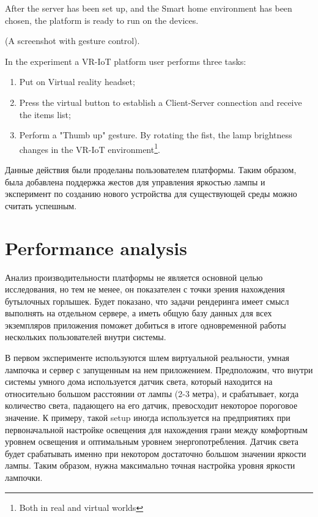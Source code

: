 After the server has been set up, and the Smart home environment has been chosen, the platform is ready to run on the devices.

(A screenshot with gesture control).

In the experiment a VR-IoT platform user performs three tasks:
\begin{enumerate}
    \item Put on Virtual reality headset;
    \item Press the virtual button to establish a Client-Server connection and receive the items list;
    \item Perform a "Thumb up" gesture. By rotating the fist, the lamp brightness changes in the VR-IoT environment\footnote{Both in real and virtual worlds}.
\end{enumerate}

Данные действия были проделаны пользователем платформы. Таким образом, была добавлена поддержка жестов для управления яркостью лампы и эксперимент по созданию нового устройства для существующей среды можно считать успешным. 

\section{Performance analysis}

Анализ производительности платформы не является основной целью исследования, но тем не менее, он показателен с точки зрения нахождения бутылочных горлышек. Будет показано, что задачи рендеринга имеет смысл выполнять на отдельном сервере, а иметь общую базу данных для всех экземпляров приложения поможет добиться в итоге одновременной работы нескольких пользователей внутри системы.

В первом эксперименте используются шлем виртуальной реальности, умная лампочка и сервер с запущенным на нем приложением. Предположим, что внутри системы умного дома используется датчик света, который находится на относительно большом расстоянии от лампы (2-3 метра), и срабатывает, когда количество света, падающего на его датчик, превосходит некоторое пороговое значение. К примеру, такой setup иногда используется на предприятиях при первоначальной настройке освещения для нахождения грани между комфортным уровнем освещения и оптимальным уровнем энергопотребления. Датчик света будет срабатывать именно при некотором достаточно большом значении яркости лампы. Таким образом, нужна максимально точная настройка уровня яркости лампочки.


